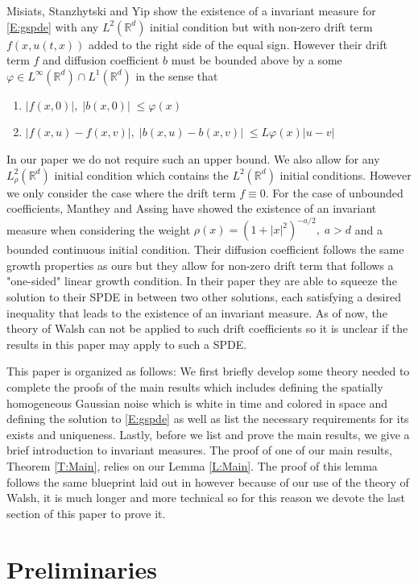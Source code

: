 \documentclass[a4paper,11pt]{article}
\numberwithin{equation}{section}
\theoremstyle{plain}
\theoremstyle{definition}
\newcommand{\R}{\mathbb{R}}
\begin{document}
Misiats, Stanzhytski and Yip \cite{MSY15} show the existence of a invariant measure for \eqref{E:gspde} with any
$L^2(\R^d)$ initial condition but with non-zero drift term $f(x,u(t,x))$ added to the right side of the equal sign.
However their drift term $f$ and diffusion coefficient $b$ must be bounded above by a some $\varphi \in L^\infty(\R^d)
\cap L^1(\R^d)$ in the sense that 
\begin{enumerate}
	\item $|f(x,0)|,\; |b(x,0)| \; \le \varphi(x)$
	\item $|f(x,u)-f(x,v)|, \; |b(x,u)-b(x,v)|\; \le L\varphi(x)|u-v|$
\end{enumerate}
In our paper we do not require such an upper bound. We also allow for any $L^2_\rho(\R^d)$ initial condition which
contains the $L^2(\R^d)$ initial conditions. However we only consider the case where the drift term $f \equiv 0$.  For
the case of unbounded coefficients, Manthey and Assing \cite{AM03} have showed the existence of an invariant measure
when considering the weight $\rho(x)=(1+|x|^2)^{-a/2},\; a>d$ and a bounded continuous initial condition. Their
diffusion coefficient follows the same growth properties as ours but they allow for non-zero drift term that follows a
"one-sided" linear growth condition. In their paper they are able to squeeze the solution to their SPDE in between two
other solutions, each satisfying a desired inequality that leads to the existence of an invariant measure. As of now,
the theory of Walsh can not be applied to such drift coefficients so it is unclear if the results in this paper may
apply to such a SPDE.
\bigskip

This paper is organized as follows: We first briefly develop some theory needed to complete the proofs of the main
results which includes defining the spatially homogeneous Gaussian noise which is white in time and colored in space and
defining the solution to \eqref{E:gspde} as well as list the necessary requirements for its exists and uniqueness.
Lastly, before we list and prove the main results, we give a brief introduction to invariant measures. The proof of one
of our main results, Theorem \ref{T:Main}, relies on our Lemma \ref{L:Main}. The proof of this lemma follows the same
blueprint laid out in \cite{TessitoreZabczyk98M} however because of our use of the theory of Walsh, it is much longer
and more technical so for this reason we devote the last section of this paper to prove it.

\section{Preliminaries} 
\end{document}
